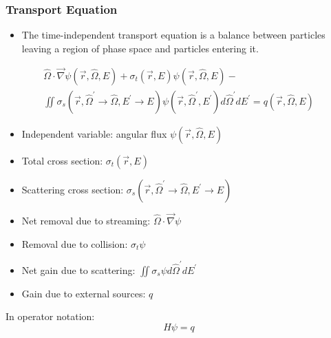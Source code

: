 \documentclass[t]{beamer}
\begin{document}
\begin{frame}
  \frametitle{Transport Equation}
  \begin{itemize}
    \item The time-independent transport equation is a balance between particles
          leaving a region of phase space and particles entering it.
  \end{itemize}
  \vskip-0.1in
  \begin{multline}
    \hat{\Omega}\cdot\vec{\nabla}\psi\left(\vec{r},\hat{\Omega},E\right) +
    \sigma_t\left(\vec{r},E\right)\psi\left(\vec{r},\hat{\Omega},E\right) - \\
    \iint\sigma_s\left(\vec{r},\hat{\Omega}^\prime\rightarrow\hat{\Omega},E^\prime\rightarrow E\right)\psi\left(\vec{r},\hat{\Omega}^\prime,E^\prime\right)d\hat{\Omega}^\prime dE^\prime =
    q\left(\vec{r},\hat{\Omega},E\right)
  \end{multline}
  \vskip-0.1in
  \begin{scriptsize}\begin{itemize}
    \item Independent variable: angular flux
          $\psi\left(\vec{r},\hat{\Omega},E\right)$
    \item Total cross section:
          $\sigma_t\left(\vec{r},E\right)$
    \item Scattering cross section:
          $\sigma_s\left(\vec{r},\hat{\Omega}^\prime\rightarrow\hat{\Omega},E^\prime\rightarrow E\right)$
    \item Net removal due to streaming:
          $\hat{\Omega}\cdot\vec{\nabla}\psi$
    \item Removal due to collision:
          $\sigma_t\psi$
    \item Net gain due to scattering:
          $\iint\sigma_s\psi d\hat{\Omega}^\prime dE^\prime$
    \item Gain due to external sources:
          $q$
  \end{itemize}\end{scriptsize}
  In operator notation:
  \begin{equation}
    H\psi = q
  \end{equation}
\end{frame}
\end{document}
